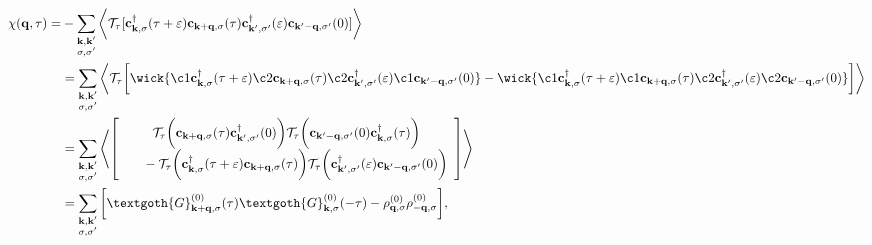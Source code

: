 \begin{equation}
    \begin{split}
        \chi({\bf q}, \tau) =& - \sum_{\substack{
        {\bf k,k'} \\
        \sigma, \sigma' 
        }} \bigg\langle 
        \mathcal{T}_{\tau} 
        [
        {\bf c}_{{\bf k}, \sigma}^\dagger(\tau + \varepsilon)
        {\bf c}_{{\bf k+q}, \sigma}(\tau)  
        {\bf c}_{{\bf k}', \sigma'}^\dagger(\varepsilon) 
        {\bf c}_{{\bf k'-q}, \sigma'}(0)  
        ]
        \bigg\rangle \\
        &= \sum_{\substack{
        {\bf k,k'} \\
        \sigma, \sigma' 
        }} \bigg\langle 
        \mathcal{T}_{\tau} \bigg[
            \wick{
                \c1{\bf c}_{{\bf k}, \sigma}^\dagger(\tau + \varepsilon)
                \c2{\bf c}_{{\bf k+q}, \sigma}(\tau)  
                \c2{\bf c}_{{\bf k}', \sigma'}^\dagger(\varepsilon) 
                \c1{\bf c}_{{\bf k'-q}, \sigma'}(0)  
            } - 
            \wick{
                \c1{\bf c}_{{\bf k}, \sigma}^\dagger(\tau + \varepsilon)
                \c1{\bf c}_{{\bf k+q}, \sigma}(\tau)  
                \c2{\bf c}_{{\bf k}', \sigma'}^\dagger(\varepsilon) 
                \c2{\bf c}_{{\bf k'-q}, \sigma'}(0)  
            }
        \bigg]
        \bigg\rangle 
        \\
        &= \sum_{\substack{
        {\bf k,k'} \\
        \sigma, \sigma' 
        }} \left\langle 
        \left[ \begin{array}{c}
             \mathcal{T}_{\tau} \bigg( 
            {\bf c}_{{\bf k+q}, \sigma}(\tau) 
            {\bf c}_{{\bf k}', \sigma'}^\dagger(0) 
        \bigg) \mathcal{T}_{\tau} \bigg( 
            {\bf c}_{{\bf k'-q}, \sigma'}(0)  
            {\bf c}_{{\bf k}, \sigma}^\dagger(\tau)
        \bigg) \\
             \blanky \blanky \blanky \blanky 
         - \mathcal{T}_{\tau} \bigg(
            {\bf c}_{{\bf k}, \sigma}^\dagger(\tau + \varepsilon)
            {\bf c}_{{\bf k+q}, \sigma}(\tau)
        \bigg) \mathcal{T}_{\tau} \bigg(
            {\bf c}_{{\bf k}', \sigma'}^\dagger(\varepsilon) 
            {\bf c}_{{\bf k'-q}, \sigma'}(0)  
        \bigg)
        \end{array}
        \right]
        \right\rangle \\
        &= \sum_{\substack{
        {\bf k,k'} \\
        \sigma, \sigma' 
        }} \bigg[\textgoth{G}_{{\bf k+q}, \sigma}^{(0)}(\tau)\textgoth{G}_{{\bf k}, \sigma}^{(0)}(-\tau) - \rho_{{\bf q}, \sigma}^{(0)}\rho_{-{\bf q}, \sigma}^{(0)}\bigg],
    \end{split}
\end{equation}

